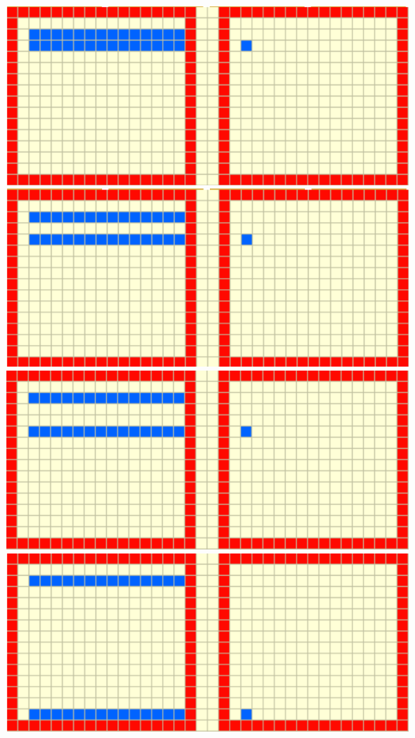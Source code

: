 \documentclass[12]{article}
\begin{document}
\begin{center}
\includegraphics[scale=0.30]{figures/lu3}
\hspace{1em}
\includegraphics[scale=0.30]{figures/lu4}
\hspace{1em}
\includegraphics[scale=0.30]{figures/lu2b}
\hspace{1em}
\includegraphics[scale=0.30]{figures/lu5}

\end{center}
\end{document}

